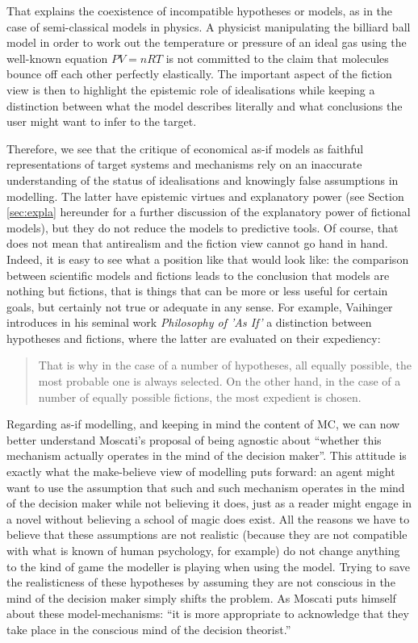 \documentclass[a4paper,11pt]{article}
\theoremstyle{definition}
\begin{document}
That explains the coexistence of incompatible hypotheses or models, as in the case of semi-classical models in physics. A physicist manipulating the billiard ball model in order to work out the temperature or pressure of an ideal gas using the well-known equation $PV=nRT$ is not committed to the claim that molecules bounce off each other perfectly elastically. The important aspect of the fiction view is then to highlight the epistemic role of idealisations while keeping a distinction between what the model describes literally and what conclusions the user might want to infer to the target.

Therefore, we see that the critique of economical as-if models as faithful representations of target systems and mechanisms rely on an inaccurate understanding of the status of idealisations and knowingly false assumptions in modelling. The latter have epistemic virtues and explanatory power (see Section \ref{sec:expla} hereunder for a further discussion of the explanatory power of fictional models), but they do not reduce the models to predictive tools. Of course, that does not mean that antirealism and the fiction view cannot go hand in hand. Indeed, it is easy to see what a position like that would look like: the comparison between scientific models and fictions leads to the conclusion that models are nothing but fictions, that is things that can be more or less useful for certain goals, but certainly not true or adequate in any sense. For example, Vaihinger introduces in his seminal work \textit{Philosophy of 'As If'} a distinction between hypotheses and fictions, where the latter are evaluated on their expediency:

\begin{quote}
    That is why in the case of a number of hypotheses, all equally possible, the most probable one is always selected. On the other hand, in the case of a number of equally possible fictions, the most expedient is chosen. \citep[p.~85, note 1]{Vaihinger2009}
\end{quote}

Regarding as-if modelling, and keeping in mind the content of MC, we can now better understand Moscati's proposal of being agnostic about ``whether this mechanism actually operates in the mind of the decision maker''. \citep[p.~2]{Moscati2023} This attitude is exactly what the make-believe view of modelling puts forward: an agent might want to use the assumption that such and such mechanism operates in the mind of the decision maker while not believing it does, just as a reader might engage in a novel without believing a school of magic does exist. All the reasons we have to believe that these assumptions are not realistic (because they are not compatible with what is known of human psychology, for example) do not change anything to the kind of game the modeller is playing when using the model. Trying to save the realisticness of these hypotheses by assuming they are not conscious in the mind of the decision maker simply shifts the problem. As Moscati puts himself about these model-mechanisms: ``it is more appropriate to acknowledge that they take place in the conscious mind of the decision theorist.'' \citep[p.~12]{Moscati2023}
\end{document}
